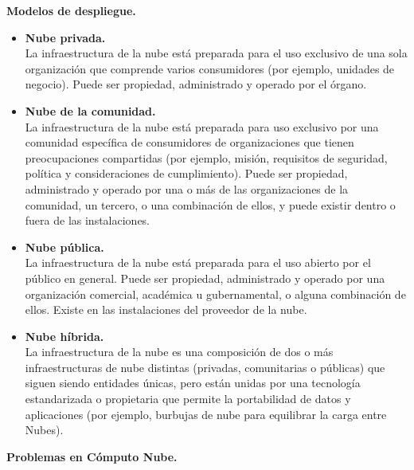  \textbf{Modelos de despliegue. }
\begin{itemize}
	\item \textbf {Nube privada. } \\ La infraestructura de la nube está preparada para el uso exclusivo de una sola organización que comprende varios consumidores (por ejemplo, unidades de negocio). Puede ser propiedad, administrado y operado por el órgano.
	\item \textbf{Nube de la comunidad. } \\ La infraestructura de la nube está preparada para uso exclusivo por una comunidad específica de consumidores de organizaciones que tienen preocupaciones compartidas (por ejemplo, misión, requisitos de seguridad, política y consideraciones de cumplimiento). Puede ser propiedad, administrado y operado por una o más de las organizaciones de la comunidad, un tercero, o una combinación de ellos, y puede existir dentro o fuera de las instalaciones.
	\item \textbf{Nube pública. } \\ La infraestructura de la nube está preparada para el uso abierto por el público en general. Puede ser propiedad, administrado y operado por una organización comercial, académica u gubernamental, o alguna combinación de ellos. Existe en las instalaciones del proveedor de la nube.
	\item \textbf{Nube híbrida. } \\  La infraestructura de la nube es una composición de dos o más infraestructuras de nube distintas (privadas, comunitarias o públicas) que siguen siendo entidades únicas, pero están unidas por una tecnología estandarizada o propietaria que permite la portabilidad de datos y aplicaciones (por ejemplo, burbujas de nube para equilibrar la carga entre Nubes).
\end{itemize}   


 \textbf{Problemas en Cómputo Nube. }

